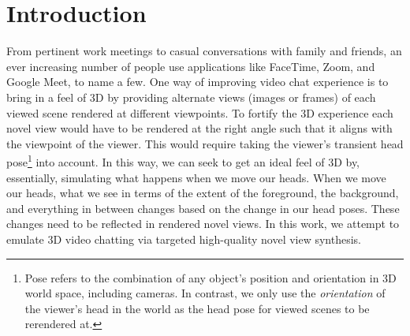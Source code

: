 \chapter{Introduction}\label{ch1:introduction}
 
From pertinent work meetings to casual conversations with family and friends, an ever increasing number of people use applications like FaceTime, Zoom, and Google Meet, to name a few. One way of improving video chat experience is to bring in a feel of 3D by providing alternate views (images or frames) of each viewed scene rendered at different viewpoints. To fortify the 3D experience each novel view would have to be rendered at the right angle such that it aligns with the viewpoint of the viewer. This would require taking the viewer's transient head pose\footnote{Pose refers to the combination of any object's position and orientation in 3D world space, including cameras. In contrast, we only use the \textit{orientation} of the viewer's head in the world as the head pose for viewed scenes to be rerendered at.} into account. In this way, we can seek to get an ideal feel of 3D by, essentially, simulating what happens when we move our heads. When we move our heads, what we see in terms of the extent of the foreground, the background, and everything in between changes based on the change in our head poses. These changes need to be reflected in rendered novel views. In this work, we attempt to emulate 3D video chatting via targeted high-quality novel view synthesis.



